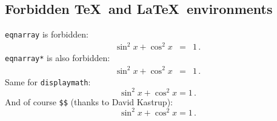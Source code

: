 \documentclass[fleqn]{article}
\begin{document}
\subsection{Forbidden \TeX\ and \LaTeX\ environments}

\verb|eqnarray| is forbidden:
\begin{eqnarray}
  \sin^2x + \cos^2x &=& 1\,.
\end{eqnarray}
\verb|eqnarray*| is also forbidden:
\begin{eqnarray*}
  \sin^2x + \cos^2x &=& 1\,.
\end{eqnarray*}
Same for \verb|displaymath|:
\begin{displaymath}
  \sin^2x + \cos^2x = 1\,.
\end{displaymath}
And of course \verb|$$| (thanks to David Kastrup):
$$
  \sin^2x + \cos^2x = 1\,.
$$
\end{document}
